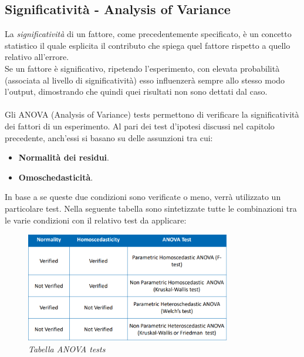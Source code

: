 \subsection{Significatività - Analysis of Variance}
La \textit{significatività} di un fattore, come precedentemente specificato, è un concetto statistico il quale esplicita il contributo che spiega quel fattore rispetto a quello relativo all'errore.
\\Se un fattore è significativo, ripetendo l'esperimento, con elevata probabilità (associata al livello di significatività) esso influenzerà sempre allo stesso modo l'output, dimostrando che quindi quei risultati non sono dettati dal caso.
\\
\\Gli ANOVA (Analysis of Variance) tests permettono di verificare la significatività dei fattori di un esperimento. Al pari dei test d'ipotesi discussi nel capitolo precedente, anch'essi si basano su delle assunzioni tra cui:
\begin{itemize}
	\item \textbf{Normalità dei residui}.
	\item \textbf{Omoschedasticità}.
\end{itemize}
In base a se queste due condizioni sono verificate o meno, verrà utilizzato un particolare test. Nella seguente tabella sono sintetizzate tutte le combinazioni tra le varie condizioni con il relativo test da applicare:
\begin{figure}[H]
	\centering
	\includegraphics[width=0.8\textwidth]{img/hw4/ANOVATests.png}
	\caption{\textit{Tabella ANOVA tests}}
	\label{table}
\end{figure}
